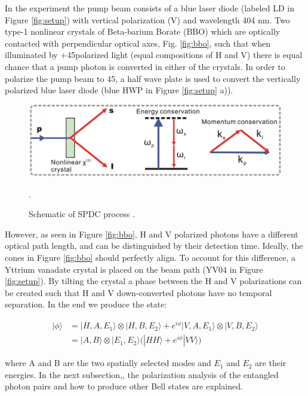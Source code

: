 In the experiment the pump beam consists of a blue laser diode (labeled LD in Figure \ref{fig:setup}) with vertical polarization (V) and wavelength 404 nm. Two type-1 nonlinear crystals of Beta-barium Borate (BBO) which are optically contacted with perpendicular optical axes, Fig. \ref{fig:bbo}, such that when illuminated by +45\textdegree polarized light (equal compositions of H and V) there is equal chance that a pump photon is converted in either of the crystals. In order to polarize the pump beam to 45\textdegree, a half wave plate is used to convert the vertically polarized blue laser diode (blue HWP in Figure \ref{fig:setup} a)).

\begin{figure}[htp]
    \centering
    \includegraphics[scale = 4]{figures/spdc.jpg}
    \caption{Schematic of SPDC process \cite{zhang2021spdc}.}.
    \label{fig:spdc}
\end{figure} 

However, as seen in Figure \ref{fig:bbo}, H and V polarized photons have a different optical path length, and can be distinguished by their detection time. Ideally, the cones in Figure \ref{fig:bbo} should perfectly align. To account for this difference, a Yttrium vanadate crystal is placed on the beam path (YV04 in Figure \ref{fig:setup}). By tilting the crystal a phase between the H and V polarizations can be created such that H and V down-converted photons have no temporal separation. In the end we produce the state:

\begin{equation}
\begin{aligned}
|\phi\rangle &= |H, A, E_1\rangle \otimes |H, B, E_2\rangle 
+ e^{i\phi} |V, A, E_1\rangle \otimes |V, B, E_2\rangle \\
&= |A, B\rangle \otimes |E_1, E_2\rangle \big(|HH\rangle + e^{i\phi} |VV\rangle \big)
\end{aligned}
\label{eq:bell_state}
\end{equation}

where A and B are the two spatially selected modes and $E_1$ and $E_2$ are their energies. In the next subsection,, the polarization analysis of the entangled photon pairs and how to produce other Bell states are explained.


